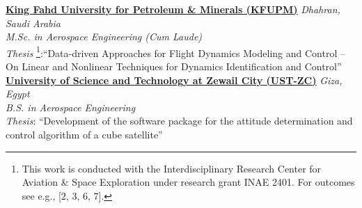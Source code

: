 \href{https://kfupm.edu.sa/}{\textbf{King Fahd University for Petroleum \& Minerals (KFUPM)}}
\hfill {\textit{Dhahran, Saudi Arabia}}\\
\textit{M.Sc. in Aerospace Engineering (Cum Laude)}\\
\textit{Thesis}
\footnote{This work is conducted with the Interdisciplinary Research Center for Aviation \& Space Exploration under research grant INAE 2401. For outcomes see e.g., [2, 3, 6, 7].}:``Data-driven Approaches for Flight Dynamics Modeling and Control -- On Linear and Nonlinear
Techniques for Dynamics Identification and Control''\\


\vspace{0.1 cm}
\href{https://zewailcity.edu.eg/}{\textbf{University of Science and Technology at Zewail City (UST-ZC)}}
\hfill {\textit{Giza, Egypt}}\\
\textit{B.S. in Aerospace Engineering}\\
\textit{Thesis}: {``Development of the software package for the attitude determination and control
algorithm of a cube satellite''} \\
